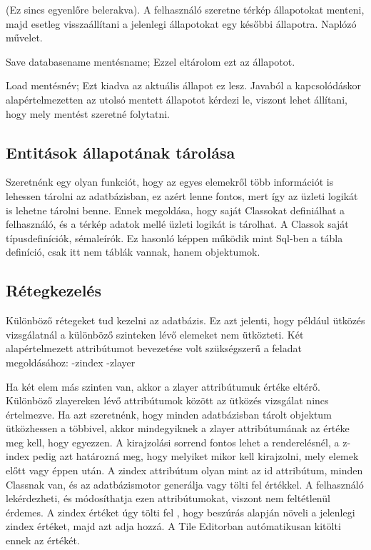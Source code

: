 \begin{sql}
(Ez sincs egyenlőre belerakva). A felhasználó szeretne térkép állapotokat menteni, majd esetleg visszaállítani a jelenlegi állapotokat egy későbbi állapotra. Naplózó művelet.

Save databasename mentésname;
Ezzel eltárolom ezt az állapotot.

Load mentésnév;
Ezt kiadva az aktuális állapot ez lesz. Javaból a kapcsolódáskor alapértelmezetten az utolsó mentett állapotot kérdezi le, viszont lehet állítani, hogy mely mentést szeretné folytatni.

\subsection{Entitások állapotának tárolása}

Szeretnénk egy olyan funkciót, hogy az egyes elemekről több információt is lehessen tárolni az adatbázisban, ez azért lenne fontos, mert így az üzleti logikát is lehetne tárolni benne. Ennek megoldása, hogy saját Classokat definiálhat a felhasználó, és a térkép adatok mellé üzleti logikát is tárolhat. A Classok saját típusdefiníciók, sémaleírók. Ez hasonló képpen működik mint Sql-ben a tábla definíció, csak itt nem táblák vannak, hanem objektumok.

\subsection{Rétegkezelés}

Különböző rétegeket tud kezelni az adatbázis. Ez azt jelenti, hogy például ütközés vizsgálatnál a különböző szinteken lévő elemeket nem ütközteti. Két alapértelmezett attribútumot bevezetése volt szükségszerű a feladat megoldásához:
-zindex
-zlayer

Ha két elem más szinten van, akkor a zlayer attribútumuk értéke eltérő. Különböző zlayereken lévő attribútumok között az ütközés vizsgálat nincs értelmezve. Ha azt szeretnénk, hogy minden adatbázisban tárolt objektum ütközhessen a többivel, akkor mindegyiknek a zlayer attribútumának az értéke meg kell, hogy egyezzen.
A kirajzolási sorrend fontos lehet a renderelésnél, a z-index pedig azt határozná meg, hogy melyiket mikor kell kirajzolni, mely elemek előtt vagy éppen után. A zindex attribútum olyan mint az id attribútum, minden Classnak van, és az adatbázismotor generálja vagy tölti fel értékkel. A felhasználó lekérdezheti, és módosíthatja ezen attribútumokat, viszont nem feltétlenül érdemes. A zindex értéket úgy tölti fel , hogy beszúrás alapján növeli a jelenlegi zindex értéket, majd azt adja hozzá. A Tile Editorban autómatikusan kitölti ennek az értékét.


\end{sql}

